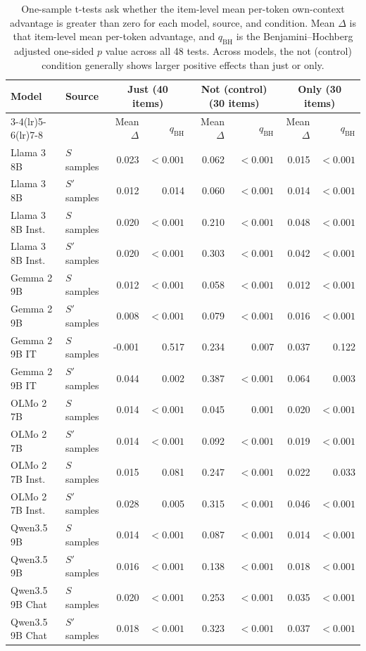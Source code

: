 \begin{table}[t]
\centering
\small
\setlength{\tabcolsep}{4.5pt}
\caption{One-sample t-tests ask whether the item-level mean per-token own-context advantage is greater than zero for each model, source, and condition. Mean $\Delta$ is that item-level mean per-token advantage, and $q_{\mathrm{BH}}$ is the Benjamini--Hochberg adjusted one-sided $p$ value across all 48 tests. Across models, the not (control) condition generally shows larger positive effects than just or only.}
\label{tab:generation-context-delta-ttests}
\begin{tabular}{llrrrrrr}
\toprule
Model & Source & \multicolumn{2}{c}{\textbf{Just} (40 items)} & \multicolumn{2}{c}{\textbf{Not (control)} (30 items)} & \multicolumn{2}{c}{\textbf{Only} (30 items)} \\
\cmidrule(lr){3-4}\cmidrule(lr){5-6}\cmidrule(lr){7-8}
 &  & Mean $\Delta$ & $q_{\mathrm{BH}}$ & Mean $\Delta$ & $q_{\mathrm{BH}}$ & Mean $\Delta$ & $q_{\mathrm{BH}}$ \\
\midrule
Llama 3 8B & $S$ samples & 0.023 & $<0.001$ & 0.062 & $<0.001$ & 0.015 & $<0.001$ \\
Llama 3 8B & $S'$ samples & 0.012 & 0.014 & 0.060 & $<0.001$ & 0.014 & $<0.001$ \\
\addlinespace[2pt]
Llama 3 8B Inst. & $S$ samples & 0.020 & $<0.001$ & 0.210 & $<0.001$ & 0.048 & $<0.001$ \\
Llama 3 8B Inst. & $S'$ samples & 0.020 & $<0.001$ & 0.303 & $<0.001$ & 0.042 & $<0.001$ \\
\addlinespace[2pt]
Gemma 2 9B & $S$ samples & 0.012 & $<0.001$ & 0.058 & $<0.001$ & 0.012 & $<0.001$ \\
Gemma 2 9B & $S'$ samples & 0.008 & $<0.001$ & 0.079 & $<0.001$ & 0.016 & $<0.001$ \\
\addlinespace[2pt]
Gemma 2 9B IT & $S$ samples & -0.001 & 0.517 & 0.234 & 0.007 & 0.037 & 0.122 \\
Gemma 2 9B IT & $S'$ samples & 0.044 & 0.002 & 0.387 & $<0.001$ & 0.064 & 0.003 \\
\addlinespace[2pt]
OLMo 2 7B & $S$ samples & 0.014 & $<0.001$ & 0.045 & 0.001 & 0.020 & $<0.001$ \\
OLMo 2 7B & $S'$ samples & 0.014 & $<0.001$ & 0.092 & $<0.001$ & 0.019 & $<0.001$ \\
\addlinespace[2pt]
OLMo 2 7B Inst. & $S$ samples & 0.015 & 0.081 & 0.247 & $<0.001$ & 0.022 & 0.033 \\
OLMo 2 7B Inst. & $S'$ samples & 0.028 & 0.005 & 0.315 & $<0.001$ & 0.046 & $<0.001$ \\
\addlinespace[2pt]
Qwen3.5 9B & $S$ samples & 0.014 & $<0.001$ & 0.087 & $<0.001$ & 0.014 & $<0.001$ \\
Qwen3.5 9B & $S'$ samples & 0.016 & $<0.001$ & 0.138 & $<0.001$ & 0.018 & $<0.001$ \\
\addlinespace[2pt]
Qwen3.5 9B Chat & $S$ samples & 0.020 & $<0.001$ & 0.253 & $<0.001$ & 0.035 & $<0.001$ \\
Qwen3.5 9B Chat & $S'$ samples & 0.018 & $<0.001$ & 0.323 & $<0.001$ & 0.037 & $<0.001$ \\
\bottomrule
\end{tabular}
\end{table}
